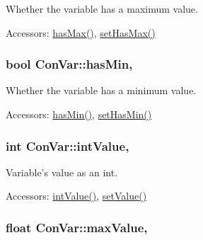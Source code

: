 Whether the variable has a maximum value. 

\begin{DoxyParagraph}{Accessors\-:}
\hyperlink{class_con_var_ab8a0883ab2a53b5ef20ea5673636ac01}{has\-Max()}, \hyperlink{class_con_var_a2bfda3901b996901e53c9a9197fd817d}{set\-Has\-Max()} 
\end{DoxyParagraph}
\hypertarget{class_con_var_a047d4105baf54cb783602456e0947196}{
\subsubsection[{has\-Min}]{\setlength{\rightskip}{0pt plus 5cm}bool Con\-Var\-::has\-Min\hspace{0.3cm}{\ttfamily [read]}, {\ttfamily [write]}}}\label{class_con_var_a047d4105baf54cb783602456e0947196}


Whether the variable has a minimum value. 

\begin{DoxyParagraph}{Accessors\-:}
\hyperlink{class_con_var_a047d4105baf54cb783602456e0947196}{has\-Min()}, \hyperlink{class_con_var_a01174fcd55542e8aae24bb8af63bff8e}{set\-Has\-Min()} 
\end{DoxyParagraph}
\hypertarget{class_con_var_a41c1d7b9907c288d9a3fd27208c14905}{
\subsubsection[{int\-Value}]{\setlength{\rightskip}{0pt plus 5cm}int Con\-Var\-::int\-Value\hspace{0.3cm}{\ttfamily [read]}, {\ttfamily [write]}}}\label{class_con_var_a41c1d7b9907c288d9a3fd27208c14905}


Variable's value as an int. 

\begin{DoxyParagraph}{Accessors\-:}
\hyperlink{class_con_var_a41c1d7b9907c288d9a3fd27208c14905}{int\-Value()}, \hyperlink{class_con_var_a855c6e0548e43aaa8876e90581a5e5f3}{set\-Value()} 
\end{DoxyParagraph}
\hypertarget{class_con_var_a1c7d02c351c6fe7e9eae58fa65ef0ae4}{
\subsubsection[{max\-Value}]{\setlength{\rightskip}{0pt plus 5cm}float Con\-Var\-::max\-Value\hspace{0.3cm}{\ttfamily [read]}, {\ttfamily [write]}}}\label{class_con_var_a1c7d02c351c6fe7e9eae58fa65ef0ae4}



